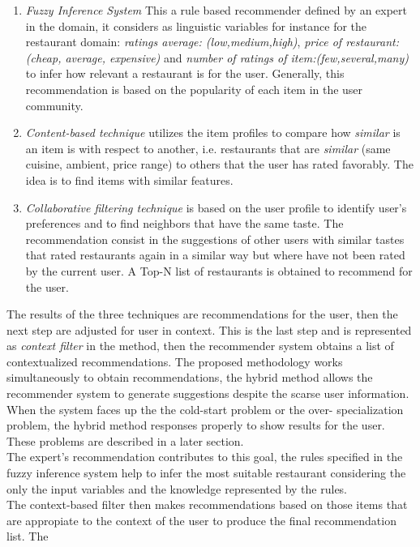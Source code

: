 \begin{enumerate}  
\item \textit{Fuzzy Inference System} This a rule based recommender 
defined by an expert in the domain, it considers as linguistic variables 
for instance for the restaurant domain: \textit{ratings average:
(low,medium,high)}, \textit{price of restaurant:(cheap, average, 
expensive)} and \textit{number of ratings of item:(few,several,many)} 
to infer how relevant a restaurant is for the user. Generally, 
this recommendation is based on the popularity of each item in the 
user community.
\item \textit{Content-based technique} utilizes the item profiles 
to compare how \textit{similar} is an item is with respect to 
another, i.e. restaurants that are \textit{similar} (same cuisine, 
ambient, price range)  to others that the user has rated favorably. 
The idea is to find items with similar features. 
\item \textit{Collaborative filtering technique} is based on the user
profile to identify user's preferences and to find neighbors that
have the same taste. The recommendation consist in the suggestions of
other users with similar tastes that rated restaurants again in a
similar way but where have not been rated by the current user. A Top-N
list of restaurants is obtained to recommend for the user.
\end{enumerate} 
The results of the three techniques are recommendations for the user,
then the next step are adjusted  for user in context. This is the last
step and is represented as \textit{context filter} in the method, then
the recommender system obtains a list of contextualized
recommendations. The proposed methodology works simultaneously to
obtain recommendations, the hybrid method allows the recommender
system to generate suggestions despite the scarse user information.
When the system faces up the the cold-start problem or the over-
specialization problem, the hybrid method responses properly to show
results for the user. These problems are described in a later
section. \\
The expert's recommendation contributes to this goal, the rules
specified in the fuzzy inference system help to infer the most
suitable restaurant considering the only the input variables and the
knowledge represented by the rules.\\ The context-based filter then
makes recommendations based on those items that are appropiate to the
context of the user to produce the final recommendation list.  The
